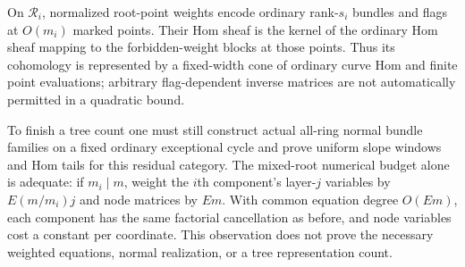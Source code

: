 \begin{remark}
On $\mathcal R_i$, normalized root-point weights encode
ordinary rank-$s_i$ bundles and flags at $O(m_i)$ marked
points. Their Hom sheaf is the kernel of the ordinary
Hom sheaf mapping to the forbidden-weight blocks at
those points. Thus its cohomology is represented by a
fixed-width cone of ordinary curve Hom and finite point
evaluations; arbitrary flag-dependent inverse matrices
are not automatically permitted in a quadratic bound.

To finish a tree count one must still construct actual
all-ring normal bundle families on a fixed ordinary
exceptional cycle and prove uniform slope windows and
Hom tails for this residual category. The mixed-root
numerical budget alone is adequate: if $m_i\mid m$,
weight the $i$th component's layer-$j$ variables by
$E(m/m_i)j$ and node matrices by $Em$. With common
equation degree $O(Em)$, each component has the same
factorial cancellation as before, and node variables
cost a constant per coordinate. This observation
does not prove the necessary weighted equations,
normal realization, or a tree representation count.
\end{remark}

